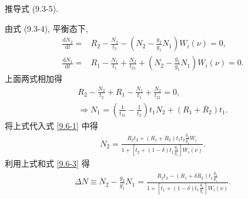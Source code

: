 \documentclass[twoside]{note}
\begin{document}
\begin{exe}
    推导式 (9.3-5).
\end{exe}
\begin{pf}
    由式 (9.3-4), 平衡态下,
    \begin{align}
        \label{9.6-1}
        \frac{\mathrm{d}N_2}{\mathrm{d}t}=&R_2-\frac{N_2}{t_2}-\left(N_2-\frac{g_2}{g_1}N_1\right)W_i(\nu)=0,\\
        \label{9.6-2}
        \frac{\mathrm{d}N_1}{\mathrm{d}t}=&R_1-\frac{N_1}{t_1}+\frac{N_2}{t_{21}}+\left(N_2-\frac{g_2}{g_1}N_1\right)W_i(\nu)=0.
    \end{align}
    上面两式相加得
    \begin{gather}
        R_2-\frac{N_2}{t_2}+R_1-\frac{N_1}{t_1}+\frac{N_2}{t_{21}}=0,\\
        \label{9.6-3}
        \Longrightarrow N_1=\left(\frac{1}{t_{21}}-\frac{1}{t_2}\right)t_1N_2+(R_1+R_2)t_1.
    \end{gather}
    将上式代入式 \eqref{9.6-1} 中得
    \begin{align}
        N_2=\frac{R_2t_2+(R_1+R_2)t_1t_2\frac{g_2}{g_1}W_i}{1+\left[t_2+(1-\delta)t_1\frac{g_2}{g_1}\right]W_i(\nu)}.
    \end{align}
    利用上式和式 \eqref{9.6-3} 得
    \begin{align}
        \Delta N\equiv N_2-\frac{g_2}{g_1}N_1=\frac{R_2t_2-(R_1+\delta R_2)t_1\frac{g_2}{g_1}}{1+\left[t_1+(1-\delta)t_1\frac{g_2}{g_1}\right]W_i(\nu)}.
    \end{align}
\end{pf}
\ifx\allfiles\undefined
\end{document}
